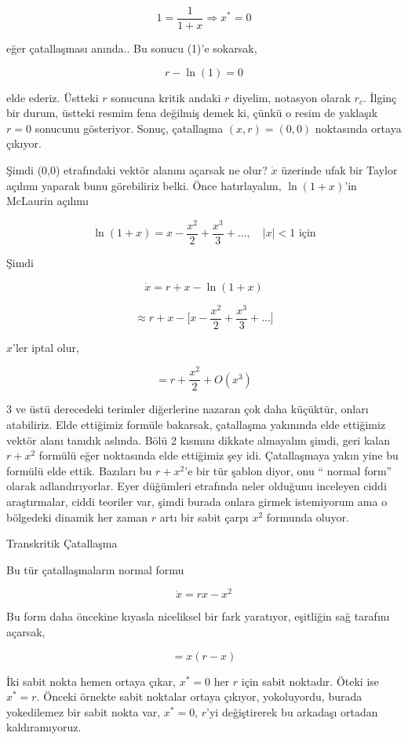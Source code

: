 \documentclass[12pt,fleqn]{article}\usepackage{../../common}
\begin{document}
$$ 1 = \frac{1}{1+x}  \Rightarrow x^\ast = 0 $$

eğer çatallaşması anında.. Bu sonucu (1)'e sokarsak,

$$ r  - \ln(1)  = 0$$

elde ederiz. Üstteki $r$ sonucuna kritik andaki $r$ diyelim, notasyon olarak
$r_c$. İlginç bir durum, üstteki resmim fena değilmiş demek ki, çünkü o resim de
yaklaşık $r=0$ sonucunu gösteriyor. Sonuç, çatallaşma $(x,r)=(0,0)$ noktasında
ortaya çıkıyor.

Şimdi (0,0) etrafındaki vektör alanını açarsak ne olur? $\dot{x}$ üzerinde ufak
bir Taylor açılımı yaparak bunu görebiliriz belki. Önce hatırlayalım,
$\ln(1+x)$'in McLaurin açılımı

$$ \ln (1+x) = x - \frac{x^2}{2} + \frac{x^3}{3} + ... , \quad |x|<1 \textrm{ için}$$

Şimdi

$$ \dot{x} = r + x - \ln(1+x)$$

$$ \approx r + x - \big[ x - \frac{x^2}{2} + \frac{x^3}{3} + ... \big] $$

$x$'ler iptal olur,

$$ = r + \frac{x^2}{2} + O(x^3) $$

3 ve üstü derecedeki terimler diğerlerine nazaran çok daha küçüktür, onları
atabiliriz. Elde ettiğimiz formüle bakarsak, çatallaşma yakınında elde ettiğimiz
vektör alanı tanıdık aslında. Bölü 2 kısmını dikkate almayalım şimdi, geri kalan
$r + x^2$ formülü eğer noktasında elde ettiğimiz şey idi. Çatallaşmaya yakın
yine bu formülü elde ettik. Bazıları bu $r + x^2$'e bir tür şablon diyor, onu ``
normal form'' olarak adlandırıyorlar. Eyer düğümleri etrafında neler olduğunu
inceleyen ciddi araştırmalar, ciddi teoriler var, şimdi burada onlara girmek
istemiyorum ama o bölgedeki dinamik her zaman $r$ artı bir sabit çarpı $x^2$
formunda oluyor.

Transkritik Çatallaşma

Bu tür çatallaşmaların normal formu

$$ \dot{x} = rx - x^2 $$

Bu form daha öncekine kıyasla niceliksel bir fark yaratıyor, eşitliğin sağ
tarafını açarsak,

$$ = x(r-x) $$

İki sabit nokta hemen ortaya çıkar, $x^\ast=0$ her $r$ için sabit noktadır. Öteki
ise $x^\ast = r$. Önceki örnekte sabit noktalar ortaya çıkıyor, yokoluyordu, burada
yokedilemez bir sabit nokta var, $x^\ast=0$, $r$'yi değiştirerek bu arkadaşı
ortadan kaldıramıyoruz.
\end{document}
